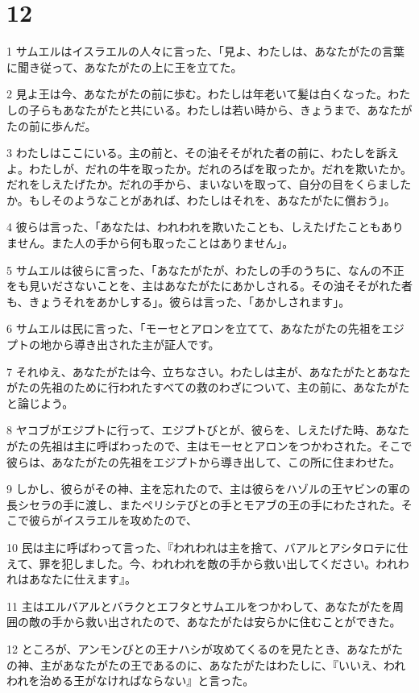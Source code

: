 \chapter{12}

\par 1 サムエルはイスラエルの人々に言った、「見よ、わたしは、あなたがたの言葉に聞き従って、あなたがたの上に王を立てた。
\par 2 見よ王は今、あなたがたの前に歩む。わたしは年老いて髪は白くなった。わたしの子らもあなたがたと共にいる。わたしは若い時から、きょうまで、あなたがたの前に歩んだ。
\par 3 わたしはここにいる。主の前と、その油そそがれた者の前に、わたしを訴えよ。わたしが、だれの牛を取ったか。だれのろばを取ったか。だれを欺いたか。だれをしえたげたか。だれの手から、まいないを取って、自分の目をくらましたか。もしそのようなことがあれば、わたしはそれを、あなたがたに償おう」。
\par 4 彼らは言った、「あなたは、われわれを欺いたことも、しえたげたこともありません。また人の手から何も取ったことはありません」。
\par 5 サムエルは彼らに言った、「あなたがたが、わたしの手のうちに、なんの不正をも見いださないことを、主はあなたがたにあかしされる。その油そそがれた者も、きょうそれをあかしする」。彼らは言った、「あかしされます」。
\par 6 サムエルは民に言った、「モーセとアロンを立てて、あなたがたの先祖をエジプトの地から導き出された主が証人です。
\par 7 それゆえ、あなたがたは今、立ちなさい。わたしは主が、あなたがたとあなたがたの先祖のために行われたすべての救のわざについて、主の前に、あなたがたと論じよう。
\par 8 ヤコブがエジプトに行って、エジプトびとが、彼らを、しえたげた時、あなたがたの先祖は主に呼ばわったので、主はモーセとアロンをつかわされた。そこで彼らは、あなたがたの先祖をエジプトから導き出して、この所に住まわせた。
\par 9 しかし、彼らがその神、主を忘れたので、主は彼らをハゾルの王ヤビンの軍の長シセラの手に渡し、またペリシテびとの手とモアブの王の手にわたされた。そこで彼らがイスラエルを攻めたので、
\par 10 民は主に呼ばわって言った、『われわれは主を捨て、バアルとアシタロテに仕えて、罪を犯しました。今、われわれを敵の手から救い出してください。われわれはあなたに仕えます』。
\par 11 主はエルバアルとバラクとエフタとサムエルをつかわして、あなたがたを周囲の敵の手から救い出されたので、あなたがたは安らかに住むことができた。
\par 12 ところが、アンモンびとの王ナハシが攻めてくるのを見たとき、あなたがたの神、主があなたがたの王であるのに、あなたがたはわたしに、『いいえ、われわれを治める王がなければならない』と言った。
